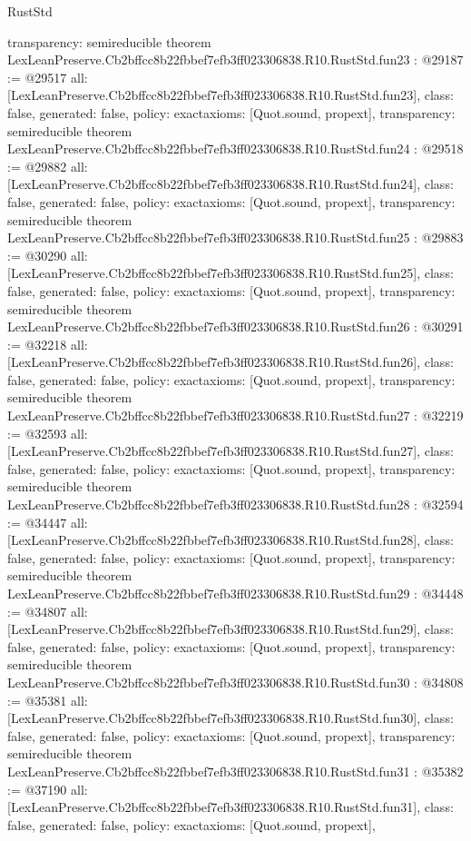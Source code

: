 \begin{lexlean}{RustStd}
\begin{coremodule}
{  transparency: semireducible
}
theorem LexLeanPreserve.Cb2bffcc8b22fbbef7efb3ff023306838.R10.RustStd.fun23 : @29187 := @29517 {
  all: [LexLeanPreserve.Cb2bffcc8b22fbbef7efb3ff023306838.R10.RustStd.fun23],
  class: false,
  generated: false,
  policy: exact{axioms: [Quot.sound, propext]},
  transparency: semireducible
}
theorem LexLeanPreserve.Cb2bffcc8b22fbbef7efb3ff023306838.R10.RustStd.fun24 : @29518 := @29882 {
  all: [LexLeanPreserve.Cb2bffcc8b22fbbef7efb3ff023306838.R10.RustStd.fun24],
  class: false,
  generated: false,
  policy: exact{axioms: [Quot.sound, propext]},
  transparency: semireducible
}
theorem LexLeanPreserve.Cb2bffcc8b22fbbef7efb3ff023306838.R10.RustStd.fun25 : @29883 := @30290 {
  all: [LexLeanPreserve.Cb2bffcc8b22fbbef7efb3ff023306838.R10.RustStd.fun25],
  class: false,
  generated: false,
  policy: exact{axioms: [Quot.sound, propext]},
  transparency: semireducible
}
theorem LexLeanPreserve.Cb2bffcc8b22fbbef7efb3ff023306838.R10.RustStd.fun26 : @30291 := @32218 {
  all: [LexLeanPreserve.Cb2bffcc8b22fbbef7efb3ff023306838.R10.RustStd.fun26],
  class: false,
  generated: false,
  policy: exact{axioms: [Quot.sound, propext]},
  transparency: semireducible
}
theorem LexLeanPreserve.Cb2bffcc8b22fbbef7efb3ff023306838.R10.RustStd.fun27 : @32219 := @32593 {
  all: [LexLeanPreserve.Cb2bffcc8b22fbbef7efb3ff023306838.R10.RustStd.fun27],
  class: false,
  generated: false,
  policy: exact{axioms: [Quot.sound, propext]},
  transparency: semireducible
}
theorem LexLeanPreserve.Cb2bffcc8b22fbbef7efb3ff023306838.R10.RustStd.fun28 : @32594 := @34447 {
  all: [LexLeanPreserve.Cb2bffcc8b22fbbef7efb3ff023306838.R10.RustStd.fun28],
  class: false,
  generated: false,
  policy: exact{axioms: [Quot.sound, propext]},
  transparency: semireducible
}
theorem LexLeanPreserve.Cb2bffcc8b22fbbef7efb3ff023306838.R10.RustStd.fun29 : @34448 := @34807 {
  all: [LexLeanPreserve.Cb2bffcc8b22fbbef7efb3ff023306838.R10.RustStd.fun29],
  class: false,
  generated: false,
  policy: exact{axioms: [Quot.sound, propext]},
  transparency: semireducible
}
theorem LexLeanPreserve.Cb2bffcc8b22fbbef7efb3ff023306838.R10.RustStd.fun30 : @34808 := @35381 {
  all: [LexLeanPreserve.Cb2bffcc8b22fbbef7efb3ff023306838.R10.RustStd.fun30],
  class: false,
  generated: false,
  policy: exact{axioms: [Quot.sound, propext]},
  transparency: semireducible
}
theorem LexLeanPreserve.Cb2bffcc8b22fbbef7efb3ff023306838.R10.RustStd.fun31 : @35382 := @37190 {
  all: [LexLeanPreserve.Cb2bffcc8b22fbbef7efb3ff023306838.R10.RustStd.fun31],
  class: false,
  generated: false,
  policy: exact{axioms: [Quot.sound, propext]},
}
\end{coremodule}
\end{lexlean}
